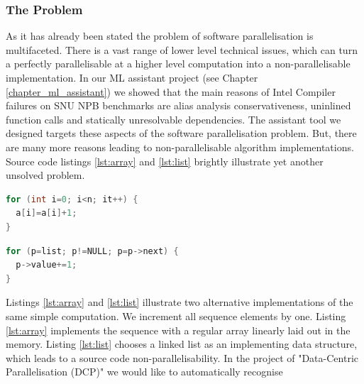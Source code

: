 \documentclass[10pt,a4paper]{report}
\begin{document}
\subsubsection{The Problem}
\quad As it has already been stated the problem of software parallelisation is multifaceted. There is a vast range of lower level technical issues, which can turn a perfectly parallelisable at a higher level computation into a non-parallelisable implementation. In our ML assistant project (see Chapter \ref{chapter_ml_assistant}) we showed that the main reasons of Intel Compiler failures on SNU NPB benchmarks are alias analysis conservativeness, uninlined function calls and statically unresolvable dependencies. The assistant tool we designed targets these aspects of the software parallelisation problem. But, there are many more reasons leading to non-parallelisable algorithm implementations. Source code listings \ref{lst:array} and \ref{lst:list} brightly illustrate yet another unsolved problem.\newline\null
\begin{minipage}[t]{0.45\linewidth}
\begin{lstlisting}[caption={Parallelisable loop operating on a \textbf{linear array}.},label={lst:array},language=C]
for (int i=0; i<n; it++) {
  a[i]=a[i]+1;
}
\end{lstlisting}
\end{minipage}
%
\begin{minipage}[t]{0.55\linewidth}
\begin{lstlisting}[caption={Non-parallelisable loop operating on a \textbf{linked-list}.},label={lst:list},language=C]
for (p=list; p!=NULL; p=p->next) {
  p->value+=1;
}
\end{lstlisting}
\end{minipage}
\quad Listings \ref{lst:array} and \ref{lst:list} illustrate two alternative implementations of the same simple computation. We increment all sequence elements by one. Listing \ref{lst:array} implements the sequence with a regular array linearly laid out in the memory. Listing \ref{lst:list} chooses a linked list as an implementing data structure, which leads to a source code non-parallelisability.\newline\null
\quad In the project of "Data-Centric Parallelisation (DCP)" we would like to automatically recognise 
\end{document}
